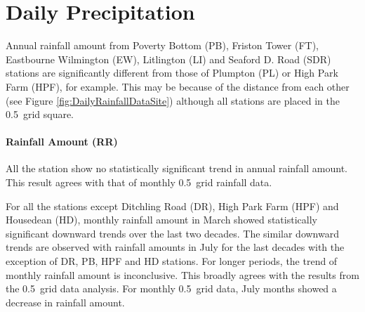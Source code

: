 \section{Daily Precipitation}
\label{sec:DailyRainfallStationData}

Annual rainfall amount from Poverty Bottom (PB), Friston Tower (FT), Eastbourne
Wilmington (EW), Litlington (LI) and Seaford D. Road (SDR) stations are
significantly different from those of Plumpton (PL) or High Park Farm (HPF), for
example. This may be because of the distance from each other (see Figure
\ref{fig:DailyRainfallDataSite}) although all stations are placed in the
0.5\textdegree\ grid square.


\paragraph{Rainfall Amount (RR)}
\label{sec:RainfallAmountRR}

All the station show no statistically significant trend in annual rainfall
amount. This result agrees with that of monthly 0.5\textdegree\ grid rainfall
data.

For all the stations except Ditchling Road (DR), High Park Farm (HPF) and
Housedean (HD), monthly rainfall amount in March showed statistically
significant downward trends over the last two decades. The similar downward
trends are observed with rainfall amounts in July for the last decades with the
exception of DR, PB, HPF and HD stations. For longer periods, the trend of
monthly rainfall amount is inconclusive. This broadly agrees with the results
from the 0.5\textdegree\ grid data analysis. For monthly 0.5\textdegree\ grid
data, July months showed a decrease in rainfall amount.


